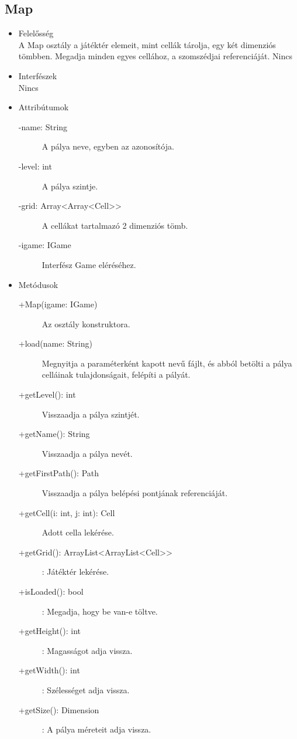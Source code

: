 \subsection{Map}
\begin{itemize}
\item Felelősség\\
A Map osztály a játéktér elemeit, mint cellák tárolja, egy két dimenziós tömbben. Megadja minden egyes cellához, a szomszédjai referenciáját. 
Nincs
\item Interfészek\\
Nincs
\item Attribútumok\\
	\begin{description}
		\item[-name: String] A pálya neve, egyben az azonosítója. 
		\item[-level: int] A pálya szintje. 
		\item[-grid: Array<Array<Cell>>] A cellákat tartalmazó 2 dimenziós tömb. 
		\item[-igame: IGame] Interfész Game eléréséhez.

		
	\end{description}
\item Metódusok\\
	\begin{description}
		
		\item[+Map(igame: IGame)] Az osztály konstruktora. 
\item[+load(name: String)] Megnyitja a paraméterként kapott nevű fájlt, és abból betölti a pálya celláinak tulajdonságait, felépíti a pályát. 
\item[+getLevel(): int] Visszaadja a pálya szintjét. 
\item[+getName(): String] Visszaadja a pálya nevét. 
\item[+getFirstPath(): Path] Visszaadja a pálya belépési pontjának referenciáját. 
\item[+getCell(i: int, j: int): Cell] Adott cella lekérése.
\item[+getGrid(): ArrayList<ArrayList<Cell>>]: Játéktér lekérése.
\item[+isLoaded(): bool]: Megadja, hogy be van-e töltve.
\item[+getHeight(): int]: Magasságot adja vissza.
\item[+getWidth(): int]: Szélességet adja vissza.
\item[+getSize(): Dimension]: A pálya méreteit adja vissza.


		
		
	\end{description}
\end{itemize}
